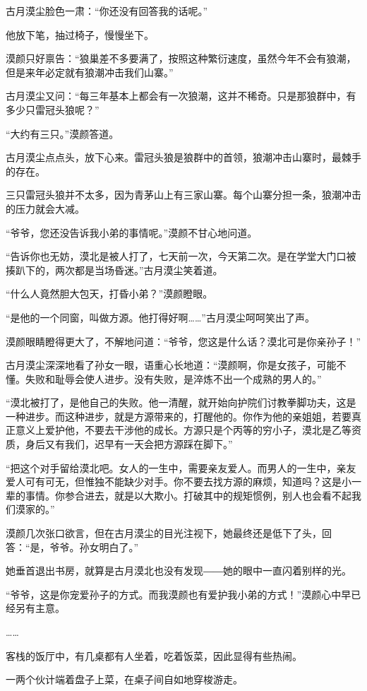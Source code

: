 \begin{this_body}
古月漠尘脸色一肃：“你还没有回答我的话呢。”

他放下笔，抽过椅子，慢慢坐下。

漠颜只好禀告：“狼巢差不多要满了，按照这种繁衍速度，虽然今年不会有狼潮，但是来年必定就有狼潮冲击我们山寨。”

古月漠尘又问：“每三年基本上都会有一次狼潮，这并不稀奇。只是那狼群中，有多少只雷冠头狼呢？”

“大约有三只。”漠颜答道。

古月漠尘点点头，放下心来。雷冠头狼是狼群中的首领，狼潮冲击山寨时，最棘手的存在。

三只雷冠头狼并不太多，因为青茅山上有三家山寨。每个山寨分担一条，狼潮冲击的压力就会大减。

“爷爷，您还没告诉我小弟的事情呢。”漠颜不甘心地问道。

“告诉你也无妨，漠北是被人打了，七天前一次，今天第二次。是在学堂大门口被揍趴下的，两次都是当场昏迷。”古月漠尘笑着道。

“什么人竟然胆大包天，打昏小弟？”漠颜瞪眼。

“是他的一个同窗，叫做方源。他打得好啊……”古月漠尘呵呵笑出了声。

漠颜眼睛瞪得更大了，不解地问道：“爷爷，您这是什么话？漠北可是你亲孙子！”

古月漠尘深深地看了孙女一眼，语重心长地道：“漠颜啊，你是女孩子，可能不懂。失败和耻辱会使人进步。没有失败，是淬炼不出一个成熟的男人的。”

“漠北被打了，是他自己的失败。他一清醒，就开始向护院们讨教拳脚功夫，这是一种进步。而这种进步，就是方源带来的，打醒他的。你作为他的亲姐姐，若要真正意义上爱护他，不要去干涉他的成长。方源只是个丙等的穷小子，漠北是乙等资质，身后又有我们，迟早有一天会把方源踩在脚下。”

“把这个对手留给漠北吧。女人的一生中，需要亲友爱人。而男人的一生中，亲友爱人可有可无，但惟独不能缺少对手。你不要去找方源的麻烦，知道吗？这是小一辈的事情。你参合进去，就是以大欺小。打破其中的规矩惯例，别人也会看不起我们漠家的。”

漠颜几次张口欲言，但在古月漠尘的目光注视下，她最终还是低下了头，回答：“是，爷爷。孙女明白了。”

她垂首退出书房，就算是古月漠北也没有发现――她的眼中一直闪着别样的光。

“爷爷，这是你宠爱孙子的方式。而我漠颜也有爱护我小弟的方式！”漠颜心中早已经另有主意。

……

客栈的饭厅中，有几桌都有人坐着，吃着饭菜，因此显得有些热闹。

一两个伙计端着盘子上菜，在桌子间自如地穿梭游走。


\end{this_body}

